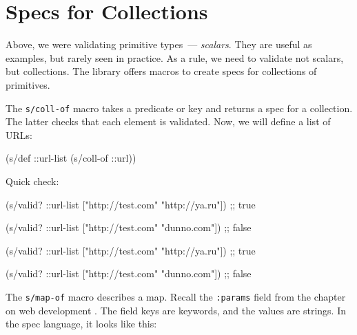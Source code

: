\section{Specs for Collections}


Above, we were validating primitive types~--- \emph{scalars}. They are useful as examples, but rarely seen in practice. As a rule, we need to validate not scalars, but collections. The library offers macros to create specs for collections of primitives.


The \verb|s/coll-of| macro takes a predicate or key and returns a spec for a collection. The latter checks that each element is validated. Now, we will define a list of URLs:

\begin{english}
  \begin{clojure}
(s/def ::url-list (s/coll-of ::url))
  \end{clojure}
\end{english}

\noindent
Quick check:

\ifx\DEVICETYPE\MOBILE

\begin{english}
  \begin{clojure}
(s/valid? ::url-list
  ["http://test.com" "http://ya.ru"])
;; true

(s/valid? ::url-list
  ["http://test.com" "dunno.com"])
;; false
  \end{clojure}
\end{english}

\else

\begin{english}
  \begin{clojure}
(s/valid? ::url-list ["http://test.com" "http://ya.ru"])
;; true

(s/valid? ::url-list ["http://test.com" "dunno.com"])
;; false
  \end{clojure}
\end{english}

\fi


The \verb|s/map-of| macro describes a map. Recall the \verb|:params| field from the chapter on web development .  The field keys are keywords, and the values are strings. In the spec language, it looks like this:

